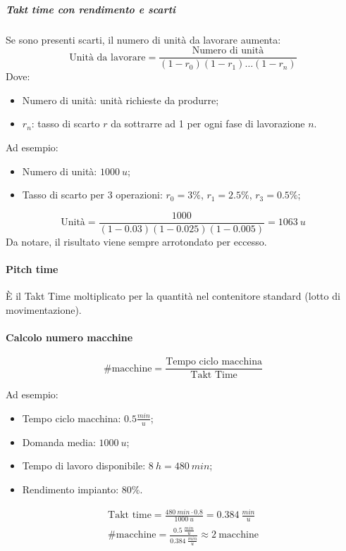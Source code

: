 %
\subparagraph{Takt time con rendimento e scarti} Se sono presenti scarti, il numero di unità da lavorare aumenta:
\[
    \text{Unità da lavorare} = \frac{\text{Numero di unità}}{(1-r_{0})(1-r_{1}) \dots (1-r_{n})}
\]
Dove:
\begin{itemize}
    \item Numero di unità: unità richieste da produrre;
    \item $ r_{n} $: tasso di scarto $ r $ da sottrarre ad 1 per ogni fase di lavorazione $ n $.
\end{itemize}
\begin{example} Ad esempio:
    \begin{itemize}
        \item Numero di unità: $ 1000\ u $;
        \item Tasso di scarto per 3 operazioni: $ r_{0} = 3\% $, $ r_{1} = 2.5\% $, $ r_{3} = 0.5\% $;
    \end{itemize}
    \[
        \text{Unità} = \frac{1000}{(1-0.03)(1-0.025)(1-0.005)} = 1063\ u
    \]
    Da notare, il risultato viene sempre arrotondato per eccesso.
\end{example}
%
%
\paragraph{Pitch time} È il Takt Time moltiplicato per la quantità nel contenitore standard (lotto di movimentazione).
%
\paragraph{Calcolo numero macchine}
\[
    \#\text{macchine} = \frac{\text{Tempo ciclo macchina}}{\text{Takt Time}}
\]
\begin{example}
    Ad esempio:
    \begin{itemize}
        \item Tempo ciclo macchina: $0.5 \frac{min}{u} $;
        \item Domanda media: $ 1000\ u $;
        \item Tempo di lavoro disponibile: $ 8\ h = 480\ min $;
        \item Rendimento impianto: $ 80\% $.
    \end{itemize}
    \begin{gather*}
        \text{Takt time} = \frac{480\ min \cdot 0.8}{1000\ u} = 0.384\ \frac{min}{u} \\
        \#\text{macchine} = \frac{0.5\ \frac{min}{u}}{0.384\ \frac{min}{u}} \approx 2\ \text{macchine}
    \end{gather*}
\end{example}
%
